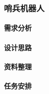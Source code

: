 \subsubsection{哨兵机器人}

    \paragraph{需求分析}
    
    \paragraph{设计思路}
    
    \paragraph{资料整理}
    
    \paragraph{任务安排}
    